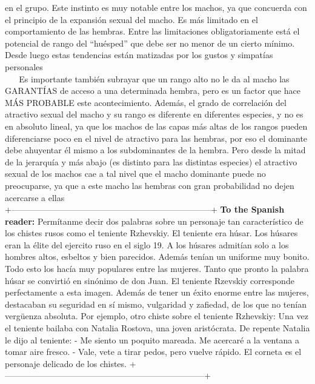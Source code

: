 en el grupo. Este instinto es muy notable entre los machos, ya que
concuerda con el principio de la expansión sexual del macho. Es más
limitado en el comportamiento de las hembras. Entre las limitaciones
obligatoriamente está el potencial de rango del ``huésped'' que debe ser
no menor de un cierto mínimo. Desde luego estas tendencias están
matizadas por los gustos y simpatías personales\\
\hspace*{0.333em} ~ ~ Es importante también subrayar que un rango alto
no le da al macho las GARANTÍAS de acceso a una determinada hembra, pero
es un factor que hace MÁS PROBABLE este acontecimiento. Además, el grado
de correlación del atractivo sexual del macho y su rango es diferente en
diferentes especies, y no es en absoluto lineal, ya que los machos de
las capas más altas de los rangos pueden diferenciarse poco en el nivel
de atractivo para las hembras, por eso el dominante debe ahuyentar él
mismo a los subdominantes de la hembra. Pero desde la mitad de la
jerarquía y más abajo (es distinto para las distintas especies) el
atractivo sexual de los machos cae a tal nivel que el macho dominante
puede no preocuparse, ya que a este macho las hembras con gran
probabilidad no dejen acercarse a ellas\\
+-----------------------------------------------------------------------+
\textbar{} \textbf{To the Spanish reader:} Permítanme decir dos palabras
sobre un \textbar{} \textbar{} personaje tan característico de los
chistes rusos como el teniente \textbar{} \textbar{} Rzhevskiy. El
teniente era húsar. Los húsares eran la élite del \textbar{} \textbar{}
ejercito ruso en el siglo 19. A los húsares admitían solo a los
\textbar{} \textbar{} hombres altos, esbeltos y bien parecidos. Además
tenían un uniforme \textbar{} \textbar{} muy bonito. Todo esto los hacía
muy populares entre las mujeres. \textbar{} \textbar{} Tanto que pronto
la palabra húsar se convirtió en sinónimo de don \textbar{} \textbar{}
Juan. El teniente Rzevskiy corresponde perfectamente a esta imagen.
\textbar{} \textbar{} Además de tener un éxito enorme entre las mujeres,
destacaban su \textbar{} \textbar{} seguridad en sí mismo, vulgaridad y
zafiedad, de los que no tenían \textbar{} \textbar{} vergüenza absoluta.
Por ejemplo, otro chiste sobre el teniente \textbar{} \textbar{}
Rzhevskiy: \textbar{} \textbar{} \textbar{} \textbar{} Una vez el
teniente bailaba con Natalia Rostova, una joven \textbar{} \textbar{}
aristócrata. \textbar{} \textbar{} De repente Natalia le dijo al
teniente: \textbar{} \textbar{} \textbar{} \textbar{} - Me siento un
poquito mareada. Me acercaré a la ventana a tomar \textbar{} \textbar{}
aire fresco. \textbar{} \textbar{} - Vale, vete a tirar pedos, pero
vuelve rápido. \textbar{} \textbar{} \textbar{} \textbar{} El corneta es
el personaje delicado de los chistes. \textbar{}
+-----------------------------------------------------------------------+

